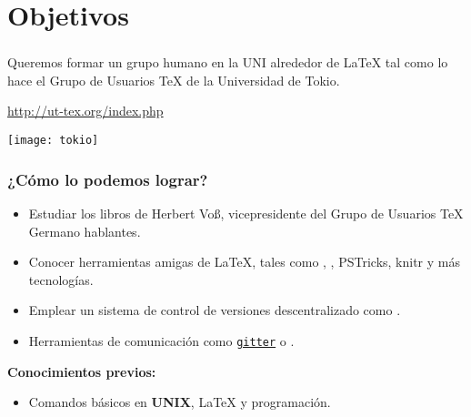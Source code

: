 \section{Objetivos}

\begin{frame}
\frametitle{\insertsection}
Queremos formar un grupo humano en la UNI alrededor de \LaTeX{} tal como lo hace el Grupo de Usuarios \TeX{} de la Universidad de Tokio.

{\centering
\url{http://ut-tex.org/index.php}
\par}

	\begin{center}
	\texttt{[image: tokio]}
	\end{center}
\end{frame}

\begin{frame}[fragile]
\frametitle{¿Cómo lo podemos lograr?}
\begin{itemize}
	\item Estudiar los libros de Herbert Vo\ss, vicepresidente del Grupo de Usuarios \TeX{} Germano hablantes.
	\item Conocer herramientas amigas de \LaTeX{}, tales como \sage, \arara, PSTricks, knitr y más tecnologías.
	\item Emplear un sistema de control de versiones descentralizado como \git.
	\item Herramientas de comunicación como \href{https://gitter.im/}{\texttt{gitter}} o \href{https://hangouts.google.com/}{\hangouts}.
\end{itemize}
\textbf{Conocimientos previos:}
\begin{itemize}
	\item Comandos básicos en \textbf{UNIX}, \LaTeX{} y programación.
\end{itemize}
\end{frame}